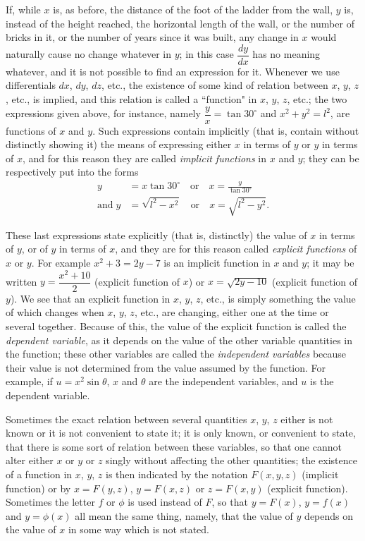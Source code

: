 \documentclass{ximera}
\begin{document}
If, while $x$ is, as before, the distance of the foot
of the ladder from the wall, $y$ is, instead of the
height reached, the horizontal length of the wall, or
the number of bricks in it, or the number of years
since it was built, any change in $x$ would naturally
cause no change whatever in $y$; in this case $\dfrac{dy}{dx}$ has
no meaning whatever, and it is not possible to find an expression for it. Whenever we use differentials
$dx$, $dy$, $dz$, etc., the existence of some kind of
relation between $x$, $y$, $z$, etc., is implied, and this
relation is called a ``function" in $x$, $y$, $z$, etc.; the
two expressions given above, for instance, namely
$\dfrac{y}{x} = \tan 30 ^{\circ}$ and $x^2 + y^2 = l^2$, are functions of $x$ and $y$.
Such expressions contain implicitly (that is, contain
without distinctly showing it) the means of expressing
either $x$ in terms of $y$ or $y$ in terms of $x$, and for
this reason they are called \textit{implicit functions} in
$x$ and $y$; they can be respectively put into the forms
\begin{align*}
y &= x \tan 30^{\circ} \quad\text{or}\quad x = \frac{y}{\tan 30 ^{\circ}} \\
 \text{and}\;
y &= \sqrt{ l^2 - x^2} \quad\text{or}\quad x = \sqrt{ l^2 - y^2}.
\end{align*}

These last expressions state explicitly (that is, distinctly)
the value of $x$ in terms of $y$, or of $y$ in terms
of $x$, and they are for this reason called \textit{explicit
functions} of $x$ or $y$. For example $x^2 + 3 = 2y - 7$ is
an implicit function in $x$ and $y$; it may be written
$y = \dfrac{x^2 + 10}{2}$ (explicit function of $x$) or $x = \sqrt{2y - 10}$
(explicit function of $y$). We see that an explicit
function in $x$, $y$, $z$, etc., is simply something the
value of which changes when $x$, $y$, $z$, etc., are
changing, either one at the time or several together.
Because of this, the value of the explicit function is
called the \textit{dependent variable}, as it depends on the
value of the other variable quantities in the function; these other variables are called the \textit{independent
variables} because their value is not determined from
the value assumed by the function. For example,
if $u = x^2 \sin \theta$, $x$ and $\theta$ are the independent variables,
and $u$ is the dependent variable.

Sometimes the exact relation between several
quantities $x$, $y$, $z$ either is not known or it is not
convenient to state it; it is only known, or convenient
to state, that there is some sort of relation
between these variables, so that one cannot alter
either $x$ or $y$ or $z$ singly without affecting the other
quantities; the existence of a function in $x$, $y$, $z$ is
then indicated by the notation $F(x, y, z)$ (implicit
function) or by $x = F(y, z)$, $y = F(x, z)$ or $z = F(x, y)$
(explicit function). Sometimes the letter $f$ or $\phi$ is used
instead of $F$, so that $y = F(x)$, $y = f(x)$ and $y = \phi(x)$
all mean the same thing, namely, that the value of $y$
depends on the value of $x$ in some way which is
not stated.
\end{document}
